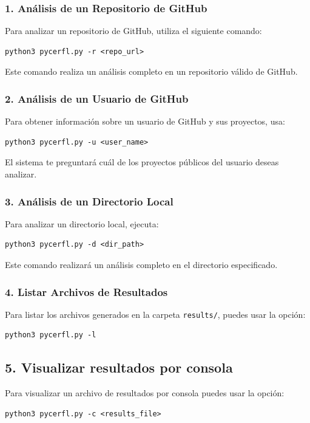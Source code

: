\documentclass[a4paper, 12pt]{book}
\begin{document}
\subsubsection{1. Análisis de un Repositorio de GitHub}
Para analizar un repositorio de GitHub, utiliza el siguiente comando:
\begin{verbatim}
python3 pycerfl.py -r <repo_url>
\end{verbatim}
Este comando realiza un análisis completo en un repositorio válido de GitHub.

\subsubsection{2. Análisis de un Usuario de GitHub}
Para obtener información sobre un usuario de GitHub y sus proyectos, usa:
\begin{verbatim}
python3 pycerfl.py -u <user_name>
\end{verbatim}
El sistema te preguntará cuál de los proyectos públicos del usuario deseas analizar.

\subsubsection{3. Análisis de un Directorio Local}
Para analizar un directorio local, ejecuta:
\begin{verbatim}
python3 pycerfl.py -d <dir_path>
\end{verbatim}
Este comando realizará un análisis completo en el directorio especificado.

\subsubsection{4. Listar Archivos de Resultados}
Para listar los archivos generados en la carpeta \texttt{results/}, puedes usar la opción:
\begin{verbatim}
python3 pycerfl.py -l
\end{verbatim}

\subsection{5. Visualizar resultados por consola}
Para visualizar un archivo de resultados por consola puedes usar la opción:
\begin{verbatim}
python3 pycerfl.py -c <results_file>
\end{verbatim}
\end{document}
